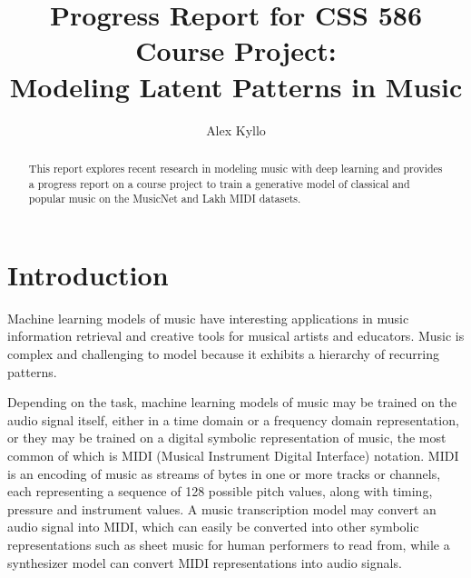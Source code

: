 \documentclass[sigconf,authorversion]{acmart}
\begin{document}
\renewcommand\footnotetextcopyrightpermission[1]{}
\pagestyle{plain}
\title{Progress Report for CSS 586 Course Project: \\
Modeling Latent Patterns in Music}


\author{Alex Kyllo}

\begin{abstract}
This report explores recent research in modeling music with deep learning and
provides a progress report on a course project to train a generative model of
classical and popular music on the MusicNet and Lakh MIDI datasets.
\end{abstract}


\maketitle

\section{Introduction}

Machine learning models of music have interesting applications in music
information retrieval and creative tools for musical artists and educators.
Music is complex and challenging to model because it exhibits a hierarchy of
recurring patterns.

Depending on the task, machine learning models of music may be trained on the
audio signal itself, either in a time domain or a frequency domain
representation, or they may be trained on a digital symbolic representation of
music, the most common of which is MIDI (Musical Instrument Digital Interface)
notation. MIDI is an encoding of music as streams of bytes in one or more tracks
or channels, each representing a sequence of 128 possible pitch values, along
with timing, pressure and instrument values. A music transcription model may
convert an audio signal into MIDI, which can easily be converted into other
symbolic representations such as sheet music for human performers to read from,
while a synthesizer model can convert MIDI representations into audio signals.
\end{document}
